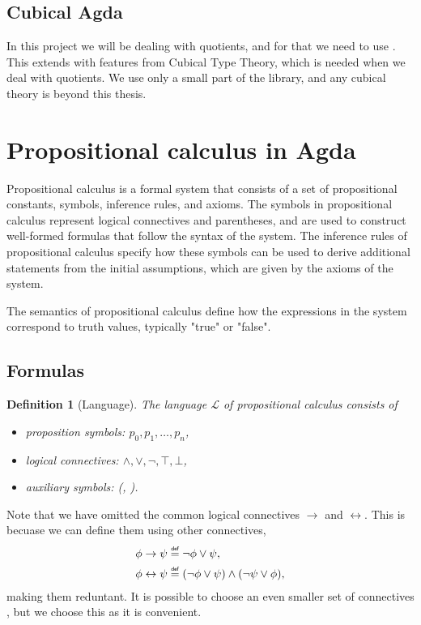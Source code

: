 \documentclass[titlepage]{article}
\newcommand\myeq{\mathrel{\overset{\makebox[0pt]{\mbox{\normalfont\tiny\sffamily def}}}{=}}}
\newtheorem{definition}{Definition}[section]
\begin{document}
\subsection{Cubical Agda}
In this project we will be dealing with quotients, and for that we need to use \CubicalAgda. This extends \Agda with features from Cubical Type Theory, which is needed when we deal with quotients.\cite{AgdaDoc} We use only a small part of the \agdaCubical library, and any cubical theory is beyond this thesis.



\section{Propositional calculus in Agda}

Propositional calculus is a formal system that consists of a set of propositional constants, symbols, inference rules, and axioms. The symbols in propositional calculus represent logical connectives and parentheses, and are used to construct well-formed formulas that follow the syntax of the system. The inference rules of propositional calculus specify how these symbols can be used to derive additional statements from the initial assumptions, which are given by the axioms of the system.

The semantics of propositional calculus define how the expressions in the system correspond to truth values, typically "true" or "false". 



\subsection{Formulas}

\begin{definition}[Language]\label{language}
    The language $\mathcal{L}$ of propositional calculus consists of
    \begin{itemize}
        \item proposition symbols: $p_0,p_1,\hdots,p_n$,
        \item logical connectives: $\wedge,\vee,\neg,\top,\bot$,
        \item auxiliary symbols: (, ).
    \end{itemize}
\end{definition}

Note that we have omitted the common logical connectives $\rightarrow$ and $\leftrightarrow$. This is becuase we can define them using other connectives, 
\begin{align*}
    \phi \rightarrow \psi &\myeq \neg \phi \vee \psi, \\
    \phi \leftrightarrow \psi &\myeq (\neg \phi \vee \psi) \wedge (\neg \psi \vee \phi),
\end{align*}making them reduntant. It is possible to choose an even smaller set of connectives \cite{vanDalen}, but we choose this as it is convenient.
\end{document}
